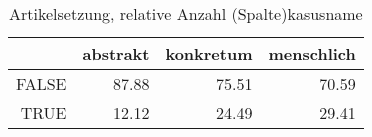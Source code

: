 \begin{table}[ht]
\centering
\begin{tabular}{rrrr}
  \hline
 & abstrakt & konkretum & menschlich \\ 
  \hline
FALSE & 87.88 & 75.51 & 70.59 \\ 
  TRUE & 12.12 & 24.49 & 29.41 \\ 
   \hline
\end{tabular}
\caption{Artikelsetzung, relative Anzahl (Spalte)kasusname} 
\end{table}

